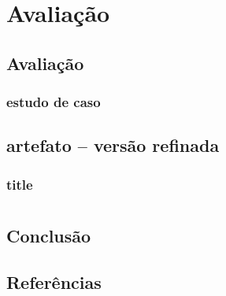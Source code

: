 \documentclass[12pt, a4paper]{book} %
\begin{document}
    \part[Avaliação]{Avaliação}

        \chapter[Avaliação]{Avaliação}
            \section[Comparativo com existente]{estudo de caso}

            \section[Grupo focal e \textit{feedback}]{}

        \chapter[Diretrizes projetuais]{artefato – versão refinada}

            \section[Comunicação do artefato aos \textit{stakeholders}]{title}


    \part*{}

        \chapter*{Conclusão}

        \chapter*{Referências}

\end{document}
